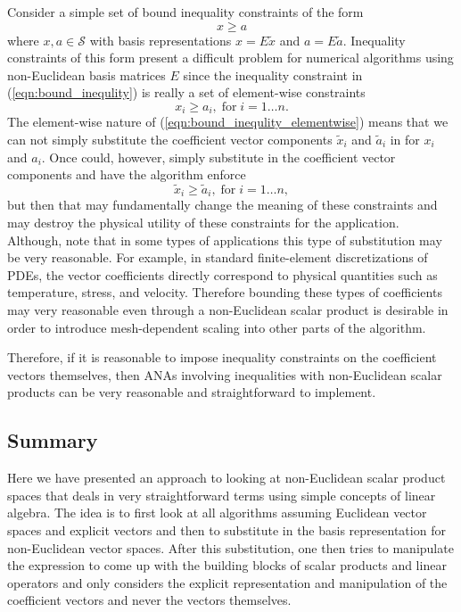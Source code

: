 Consider a simple set of bound inequality constraints of the form
%
\begin{equation}
x \ge a
\label{eqn:bound_inequlity}
\end{equation}
%
where $x,a\in\mathcal{S}$ with basis representations $x = E\tilde{x}$ and $a =
E\tilde{a}$.  Inequality constraints of this form present a difficult problem
for numerical algorithms using non-Euclidean basis matrices $E$ since the
inequality constraint in (\ref{eqn:bound_inequlity}) is really a set of
element-wise constraints
%
\begin{equation}
x_i \ge a_i, \; \mbox{for} \; i=1 \ldots n.
\label{eqn:bound_inequlity_elementwise}
\end{equation}
%
The element-wise nature of (\ref{eqn:bound_inequlity_elementwise}) means that
we can not simply substitute the coefficient vector components $\tilde{x}_i$
and $\tilde{a}_i$ in for $x_i$ and $a_i$.  Once could, however, simply
substitute in the coefficient vector components and have the algorithm enforce
%
\begin{equation}
\tilde{x}_i \ge \tilde{a}_i, \; \mbox{for} \; i=1 \ldots n,
\label{eqn:bound_inequlity_coefficients_elementwise}
\end{equation}
%
but then that may fundamentally change the meaning of these constraints and
may destroy the physical utility of these constraints for the application.
Although, note that in some types of applications this type of substitution
may be very reasonable.  For example, in standard finite-element
discretizations of PDEs, the vector coefficients directly correspond to
physical quantities such as temperature, stress, and velocity.  Therefore
bounding these types of coefficients may very reasonable even through a
non-Euclidean scalar product is desirable in order to introduce mesh-dependent
scaling into other parts of the algorithm.

Therefore, if it is reasonable to impose inequality constraints on the
coefficient vectors themselves, then ANAs involving inequalities with
non-Euclidean scalar products can be very reasonable and straightforward to
implement.

\subsection{Summary}

Here we have presented an approach to looking at non-Euclidean scalar product
spaces that deals in very straightforward terms using simple concepts of linear
algebra.  The idea is to first look at all algorithms assuming Euclidean
vector spaces and explicit vectors and then to substitute in the basis
representation for non-Euclidean vector spaces.  After this substitution, one
then tries to manipulate the expression to come up with the building blocks of
scalar products and linear operators and only considers the explicit
representation and manipulation of the coefficient vectors and never the vectors
themselves.

